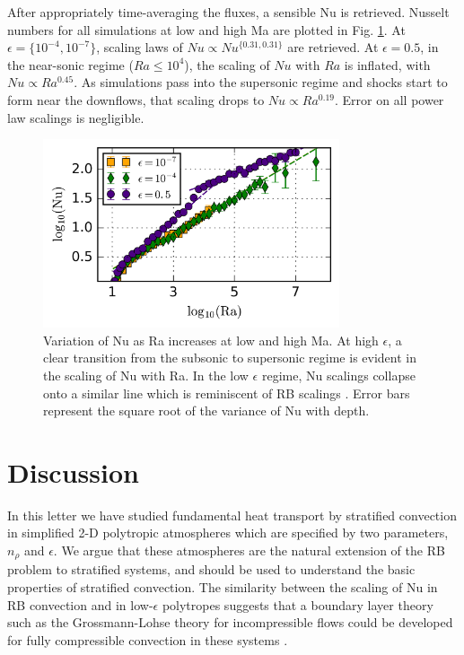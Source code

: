 \documentclass[aps, prl, twocolumn, nofootinbib, groupedaddress, amsfonts, amssymb, amsmath]{revtex4-1}
\newcommand{\nrho}{\ensuremath{n_{\rho}}}
\begin{document}
After appropriately time-averaging the fluxes, a sensible Nu is retrieved.  Nusselt numbers for
all simulations at low and high Ma are plotted in Fig. \ref{fig:nu_v_ra}.  At $\epsilon = \{10^{-4}, 10^{-7}\}$,
scaling laws of $Nu \propto Nu^{\{0.31, 0.31\}}$ are retrieved.  At $\epsilon = 0.5$, in the near-sonic
regime ($Ra \leq 10^4$), the scaling of $Nu$ with $Ra$ is inflated, with $Nu \propto Ra^{0.45}$.  As simulations
pass into the supersonic regime and shocks start to form near the downflows,
that scaling drops to $Nu \propto Ra^{0.19}$.  Error on all power law scalings is negligible.

\begin{figure}[t]
\includegraphics[width=3.4375in]{./figs/nu_v_ra.png}
\caption{Variation of Nu as Ra increases at low and high Ma. 
At high $\epsilon$, a clear transition from the subsonic to supersonic regime is evident in the scaling
of Nu with Ra.  In the low $\epsilon$ regime, Nu scalings collapse onto a similar line which is
reminiscent of RB scalings \cite{johnston&doering2009}.  Error bars represent the square root of
the variance of Nu with depth.
\label{fig:nu_v_ra} }
\end{figure}

\section{Discussion}
\label{sec:discussion}
In this letter we have studied fundamental heat transport by stratified convection in simplified 2-D polytropic
atmospheres which are specified by two parameters, $\nrho$ 
and $\epsilon$.  We argue that these atmospheres are the natural extension
of the RB problem to stratified systems, and should be used to understand the basic properties of stratified
convection.  The similarity between the scaling of Nu in RB convection and in low-$\epsilon$ polytropes suggests 
that a boundary layer theory such as the Grossmann-Lohse theory for incompressible flows
could be developed for fully compressible convection in these systems \cite{ahlers&all2009}.  
\end{document}
